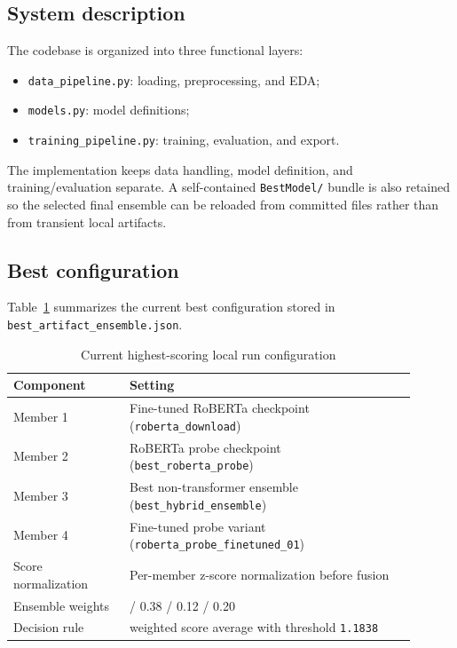 \documentclass[11pt]{article}
\begin{document}
    \subsection{System description}
    The codebase is organized into three functional layers:
    \begin{itemize}[leftmargin=1.5em]
    \item \texttt{data\_pipeline.py}: loading, preprocessing, and EDA;
    \item \texttt{models.py}: model definitions;
    \item \texttt{training\_pipeline.py}: training, evaluation, and export.
    \end{itemize}

The implementation keeps data handling, model definition, and
training/evaluation separate. A self-contained \texttt{BestModel/} bundle is
also retained so the selected final ensemble can be reloaded from committed
files rather than from transient local artifacts.

    \subsection{Best configuration}
    Table~\ref{tab:best-config} summarizes the current best configuration stored in
    \texttt{best\_artifact\_ensemble.json}.

    \begin{table}[H]
    \centering
    \caption{Current highest-scoring local run configuration}
    \label{tab:best-config}
    \begin{tabular}{>{\raggedright\arraybackslash}p{0.26\linewidth} >{\raggedright\arraybackslash}p{0.64\linewidth}}
    \toprule
    Component & Setting \\
    \midrule
    Member 1 & Fine-tuned RoBERTa checkpoint (\texttt{roberta\_download}) \\
    Member 2 & RoBERTa probe checkpoint (\texttt{best\_roberta\_probe}) \\
    Member 3 & Best non-transformer ensemble (\texttt{best\_hybrid\_ensemble}) \\
    Member 4 & Fine-tuned probe variant (\texttt{roberta\_probe\_finetuned\_01}) \\
    Score normalization & Per-member z-score normalization before fusion \\
    Ensemble weights & 0.30 / 0.38 / 0.12 / 0.20 \\
    Decision rule & weighted score average with threshold \texttt{1.1838} \\
    \bottomrule
    \end{tabular}
    \end{table}
\end{document}
